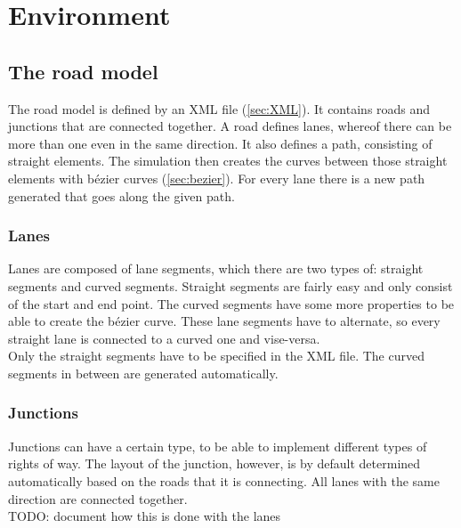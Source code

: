 
\section{Environment}
\label{sec:environment}

\subsection{The road model}
\label{sec:roadModel}

The road model is defined by an XML file (\ref{sec:XML}). It contains roads and
junctions that are connected together. A road defines lanes, whereof
there can be more than one even in the same direction. It also defines
a path, consisting of straight elements. The simulation then creates the 
curves between those straight elements with bézier curves (\ref{sec:bezier}).
For every lane there is a new path generated that goes along the given path.


\subsubsection{Lanes}
\label{sec:lanes}

Lanes are composed of lane segments, which there are two types of:
straight segments and curved segments. Straight segments are fairly
easy and only consist of the start and end point. The curved segments
have some more properties to be able to create the bézier curve. 
These lane segments have to alternate, so every straight lane is connected
to a curved one and vise-versa. \\

\noindent Only the straight segments have to be specified in the XML file. 
The curved segments in between are generated automatically.


\subsubsection{Junctions}
\label{sec:junctions}

Junctions can have a certain type, to be able to implement different types
of rights of way. The layout of the junction, however, is by default 
determined automatically based on the roads that it is connecting. All 
lanes with the same direction are connected together. \\

TODO: document how this is done with the lanes

